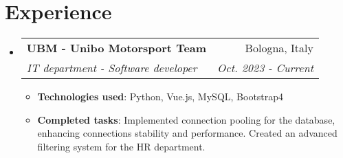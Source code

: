 \documentclass[letterpaper,11pt]{article}
\makeatletter
\newcommand{\resumeItem}[2]{
  \item\small{
    \textbf{#1}{: #2 \vspace{-2pt}}
  }
}
\newcommand{\resumeSubheading}[4]{
  \vspace{-1pt}\item
    \begin{tabular*}{0.97\textwidth}{l@{\extracolsep{\fill}}r}
      \textbf{#1} & #2 \\
      \textit{\small#3} & \textit{\small #4} \\
    \end{tabular*}\vspace{-5pt}
}
\newcommand{\resumeSubHeadingListStart}{\begin{itemize}[leftmargin=*]}
\newcommand{\resumeSubHeadingListEnd}{\end{itemize}}
\newcommand{\resumeItemListStart}{\begin{itemize}}
\newcommand{\resumeItemListEnd}{\end{itemize}\vspace{-5pt}}
\makeatother
\begin{document}
\section{Experience}
\resumeSubHeadingListStart
    \resumeSubheading{UBM - Unibo Motorsport Team}{Bologna, Italy}{IT department - Software developer}{Oct. 2023 - Current}
    \resumeItemListStart
        \resumeItem{Technologies used} {Python, Vue.js, MySQL, Bootstrap4}
        \resumeItem{Completed tasks}
        {Implemented connection pooling for the database, enhancing connections stability and performance. Created an advanced filtering system for the HR department.}
    \resumeItemListEnd
\resumeSubHeadingListEnd
\begin{comment}

  \resumeSubHeadingListStart
    
    \resumeSubheading
      {UBM - Unibo Motorsport Team}{Bologna, Italy}
      {Software developer}{Oct. 2023 - Current}
      \resumeItemListStart
        \resumeItem{Python}
          {I improved the back-end of the application, implementing new features, 
            documenting the code and fixing bugs.
            In particular:}
            \resumeItemListStart
                \resumeItem{Connection pooling}
                    {I implemented a connection pool to the database, to avoid the overhead of creating a new connection every time a request is made.}
            \resumeItemListEnd
      \resumeItemListEnd

  
    \resumeSubheading
      {Other Company}{Location}
      {Position}{From - To}
      \resumeItemListStart
        \resumeItem{Technology you worked with/on}
          {Description}
        \resumeItem{Other technology you worked with/on}
          {Description}
      \resumeItemListEnd

    \resumeSubheading
      {Research Position}{Location}
      {Position}{From - To}
      \resumeItemListStart
        \resumeItem{Technology you worked with/on}
          {Description}
        \resumeItem{Other technology you worked with/on}
          {Description}
      \resumeItemListEnd

  \resumeSubHeadingListEnd
\end{comment}
%
\begin{comment}
\section{Languages}
    \resumeSubHeadingListStart
    \resumeItem
      {Italian}{Native speaker}
    \resumeItem
      {English}{Level C1}
  \resumeSubHeadingListEnd
\end{comment}
\end{document}

